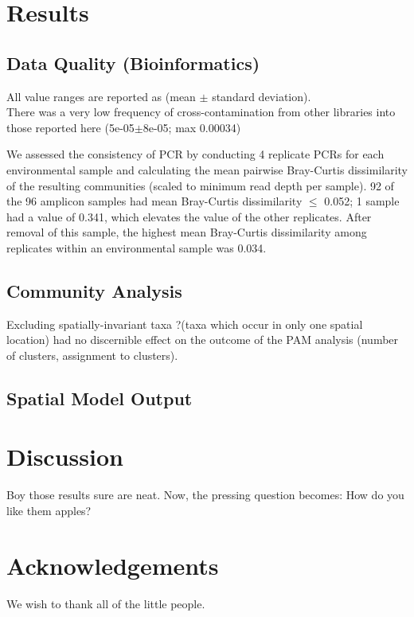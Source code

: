 \documentclass[11pt,letterpaper]{article} %
\begin{document}
\section*{Results}
\subsection*{Data Quality (Bioinformatics)}
All value ranges are reported as (mean $\pm$ standard deviation).\\
There was a very low frequency of cross-contamination from other libraries into those reported here (5e-05$\pm$8e-05; max 0.00034)

We assessed the consistency of PCR by conducting 4 replicate PCRs for each environmental sample and calculating the mean pairwise Bray-Curtis dissimilarity of the resulting communities (scaled to minimum read depth per sample). 
92 of the 96 amplicon samples had mean Bray-Curtis dissimilarity $\leq$ 0.052; 1 sample had a value of 0.341, which elevates the value of the other replicates. 
After removal of this sample, the highest mean Bray-Curtis dissimilarity among replicates within an environmental sample was 0.034. 



\subsection*{Community Analysis}
Excluding spatially-invariant taxa ?(taxa which occur in only one spatial location) had no discernible effect on the outcome of the PAM analysis (number of clusters, assignment to clusters).

\subsection*{Spatial Model Output}


\section*{Discussion}
Boy those results sure are neat. Now, the pressing question becomes: How do you like them apples?

\section*{Acknowledgements}
We wish to thank all of the little people.
\end{document}
